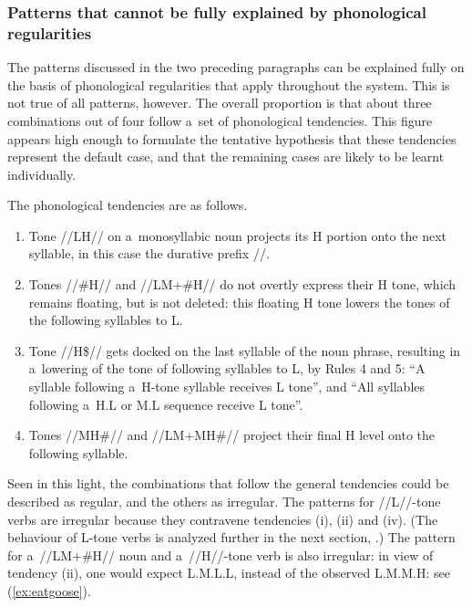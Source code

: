 \subsubsection{Patterns that cannot be fully explained by phonological regularities}
\label{sec:commentsonpatternsthatcannotbefullyexplainedonaphonologicalbasis}


The patterns discussed in the two preceding paragraphs can be explained fully on the basis of phonological regularities that apply throughout the system. This is not true of all patterns, however. The overall proportion is that about three combinations out of four follow a~set of phonological tendencies. This figure appears high enough to formulate the tentative hypothesis that these tendencies represent the default case, and that the remaining cases are likely to be learnt individually. 

\largerpage
The phonological tendencies are as follows.

\begin{enumerate}[label=(\roman*), itemsep=0pt]
\item Tone \mbox{//LH//} on a~{monosyllabic} noun projects its H portion onto the next syllable, in this case the {durative} prefix //. 
\item Tones \mbox{//\#H//} and //LM+\#H// do not overtly express their H tone, which remains floating, but is not deleted: this floating H tone lowers the tones of the following syllables to L. 
\item Tone \mbox{//H\$//} gets docked on the last syllable of the noun phrase, resulting in a~lowering of the tone of following syllables to L, by Rules 4 and 5: “A syllable following a~H-tone syllable receives L tone”, and “All syllables following a~H.L or M.L sequence receive L tone”.
\item Tones \mbox{//MH\#//} and //LM+MH\#// project their final H level onto the following syllable. 
\end{enumerate}

Seen in this light, the combinations that follow the general tendencies could be described as regular, and the others as irregular. The patterns for //L//-tone verbs are irregular because they contravene tendencies (i), (ii) and (iv). (The behaviour of L-tone verbs is analyzed further in the next section, .) The pattern for a~//LM+\#H// noun and a~//H//-tone verb is also irregular: in view of tendency (ii), one would expect L.M.L.L,  instead of the observed L.M.M.H: see (\ref{ex:eatgoose}).

